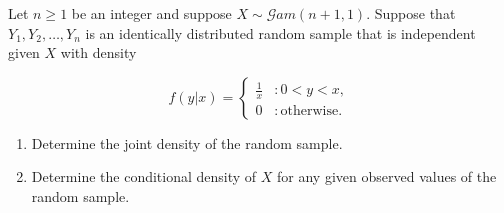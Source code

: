 \documentclass[12pt,reqno]{amsart}
\begin{document}
\newpage
\prob Let $n\geq 1$ be an integer and suppose $X \sim \mathcal{G}am(n+1,1)$. Suppose that $Y_1,Y_2,\ldots,Y_n$ is an identically distributed random sample that is independent given $X$ with density

	\[
	f(y|x) = \begin{cases}
	\frac{1}{x} & : 0 < y < x, \\
	0 & : \text{otherwise}.
	\end{cases}
	\]
	
\medskip
\begin{enumerate}
\item Determine the joint density of the random sample.\vfill
\item Determine the conditional density of $X$ for any given observed values of the random sample.\vfill
\end{enumerate}
\end{document}
